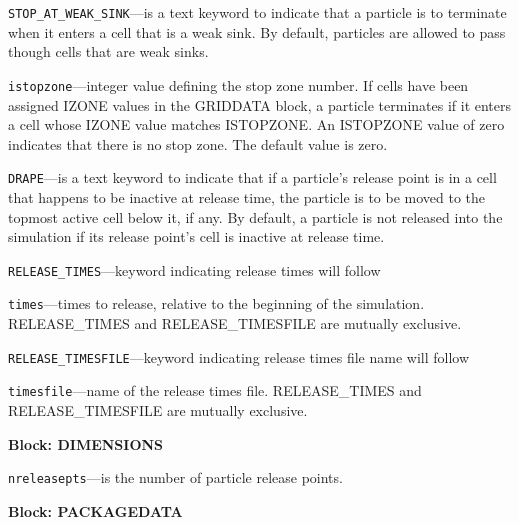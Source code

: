 \begin{description}
\item \texttt{STOP\_AT\_WEAK\_SINK}---is a text keyword to indicate that a particle is to terminate when it enters a cell that is a weak sink.  By default, particles are allowed to pass though cells that are weak sinks.

\item \texttt{istopzone}---integer value defining the stop zone number.  If cells have been assigned IZONE values in the GRIDDATA block, a particle terminates if it enters a cell whose IZONE value matches ISTOPZONE.  An ISTOPZONE value of zero indicates that there is no stop zone.  The default value is zero.

\item \texttt{DRAPE}---is a text keyword to indicate that if a particle's release point is in a cell that happens to be inactive at release time, the particle is to be moved to the topmost active cell below it, if any. By default, a particle is not released into the simulation if its release point's cell is inactive at release time.

\item \texttt{RELEASE\_TIMES}---keyword indicating release times will follow

\item \texttt{times}---times to release, relative to the beginning of the simulation.  RELEASE\_TIMES and RELEASE\_TIMESFILE are mutually exclusive.

\item \texttt{RELEASE\_TIMESFILE}---keyword indicating release times file name will follow

\item \texttt{timesfile}---name of the release times file.  RELEASE\_TIMES and RELEASE\_TIMESFILE are mutually exclusive.

\end{description}
\item \textbf{Block: DIMENSIONS}

\begin{description}
\item \texttt{nreleasepts}---is the number of particle release points.

\end{description}
\item \textbf{Block: PACKAGEDATA}


